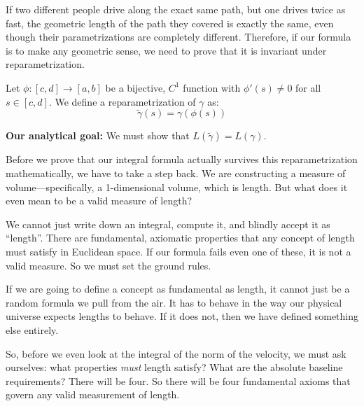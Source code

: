 \begin{spokenclean}[00:08:30 - 00:09:30]
If two different people drive along the exact same path, but one drives twice as fast, the geometric length of the path they covered is exactly the same, even though their parametrizations are completely different. Therefore, if our formula is to make any geometric sense, we need to prove that it is invariant under reparametrization.
\end{spokenclean}

\begin{mathstroke}
Let $\phi: [c, d] \to [a, b]$ be a bijective, $C^1$ function with $\phi'(s) \neq 0$ for all $s \in [c, d]$.
We define a reparametrization of $\gamma$ as:
\[
\tilde{\gamma}(s) = \gamma(\phi(s))
\]

\textbf{Our analytical goal:} We must show that $L(\tilde{\gamma}) = L(\gamma)$.
\end{mathstroke}

\begin{spokenclean}[00:09:30 - 00:10:30]
Before we prove that our integral formula actually survives this reparametrization mathematically, we have to take a step back. We are constructing a measure of volume—specifically, a 1-dimensional volume, which is length. But what does it even mean to be a valid measure of length?
\end{spokenclean}

\begin{spokenclean}[00:10:30 - 00:11:30]
We cannot just write down an integral, compute it, and blindly accept it as ``length''. There are fundamental, axiomatic properties that any concept of length must satisfy in Euclidean space. If our formula fails even one of these, it is not a valid measure. So we must set the ground rules.
\end{spokenclean}


\begin{spokenclean}[00:11:30 - 00:12:30]
If we are going to define a concept as fundamental as length, it cannot just be a random formula we pull from the air. It has to behave in the way our physical universe expects lengths to behave. If it does not, then we have defined something else entirely. 

So, before we even look at the integral of the norm of the velocity, we must ask ourselves: what properties \textit{must} length satisfy? What are the absolute baseline requirements? There will be four. So there will be four fundamental axioms that govern any valid measurement of length.
\end{spokenclean}

